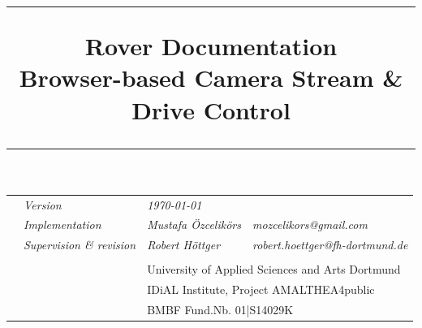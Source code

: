 


	\title{\rule{\textwidth}{1pt}\textbf{ Rover Documentation} \\ Browser-based Camera Stream \& Drive Control \rule{\textwidth}{1pt}\vspace{-20pt}}
	\date{}
	\maketitle 
	\setlength{\headsep}{20pt}
	\vspace{-20pt}
	\begin{tabularx}{\textwidth}{Xlll}
		& \textit{Version} & \textit{\today }&\\
		&\textit{Implementation} &\textit{Mustafa Özcelikörs} & \textit{mozcelikors@gmail.com}\\
		&\textit{Supervision \& revision} &\textit{Robert Höttger} &\textit{robert.hoettger@fh-dortmund.de}\\ \\
		&&\multicolumn{2}{l}{University of Applied Sciences and Arts Dortmund}\\ 
		&&\multicolumn{2}{l}{IDiAL Institute, Project AMALTHEA4public}\\
		&&\multicolumn{2}{l}{BMBF  	Fund.Nb. 01|S14029K} 
	\end{tabularx} 
	\vspace{15pt}\\
